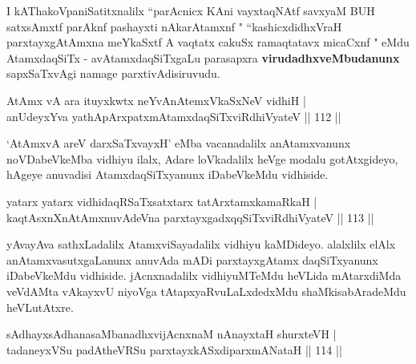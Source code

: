 \begin{artha}
I kAThakoVpaniSatitxnalilx ``parAcnicx KAni vayxtaqNAtf savxyaM BUH satxsAmxtf parAknf pashayxti nAkarAtamxnf " ``kashicxdidhxVraH parxtayxgAtAmxna meYkaSxtf A vaqtatx cakuSx ramaqtatavx micaCxnf " eMdu AtamxdaqSiTx - avAtamxdaqSiTxgaLu parasapxra \textbf{virudadhxveMbudanunx} sapxSaTxvAgi namage parxtivAdisiruvudu.
\end{artha}


\begin{shl}
AtAmx vA ara ituyxkwtx neYvAnAtemxVkaSxNeV vidhiH |\\
anUdeyxYva yathApArxpatxmAtamxdaqSiTxviRdhiVyateV \hfill || 112 ||
\end{shl}

`AtAmxvA areV darxSaTxvayxH' eMba vacanadalilx anAtamxvanunx noVDabeVkeMba vidhiyu ilalx, Adare loVkadalilx heVge modalu gotAtxgideyo, hAgeye anuvadisi AtamxdaqSiTxyanunx iDabeVkeMdu vidhiside.


\begin{shl}
yatarx yatarx vidhidaqRSaTxsatxtarx tatArx\s \s tamxkamaRkaH |\\
kaqtAsxnXnAtAmxnuvAdeVna parxtayxgadxqqSiTxviRdhiVyateV \hfill || 113 ||
\end{shl}

\begin{artha}
yAvayAva sathxLadalilx AtamxviSayadalilx vidhiyu kaMDideyo. alalxlilx elAlx anAtamxvasutxgaLanunx anuvAda mADi parxtayxgAtamx daqSiTxyanunx iDabeVkeMdu vidhiside. jAcnxnadalilx vidhiyuMTeMdu heVLida mAtarxdiMda veVdAMta vAkayxvU niyoVga tAtapxyaRvuLaLxdedxMdu shaMkisabAradeMdu heVLutAtxre. 
\end{artha}


\begin{shl}
sAdhayxsAdhanasaMbanadhxvijAcnxnaM nAnayxtaH shurxteVH |\\
tadaneyxVSu padAtheVRSu parxtayxkASxdiparxmANataH \hfill || 114 ||
\end{shl}

